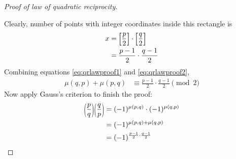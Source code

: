 \documentclass{subfile}
\begin{document}
\begin{proof}[Proof of law of quadratic reciprocity]
\begin{center}
	\end{center}
	Clearly, number of points with integer coordinates inside this rectangle is
	\begin{align}\label{eq:qrlawproof2}
		x
			& =\floor{\frac{p}{2}}\cdot \floor{\frac{q}{2}}\\
			& = \frac{p-1}{2}\cdot\frac{q-1}{2}
	\end{align}
	Combining equations \eqref{eq:qrlawproof1} and \eqref{eq:qrlawproof2},
	\begin{align*}
		\mu(q,p)+\mu(p,q)
			& \equiv \frac{p-1}{2}\cdot\frac{q-1}{2} \pmod 2
	\end{align*}
	Now apply Gauss's criterion to finish the proof:
	\begin{align*}
		\func{}{\dfrac{p}{q}}\func{}{\dfrac{q}{p}}
			&=(-1)^{\mu(p,q)} \cdot (-1)^{\mu(q,p)} \\
			&= (-1)^{\mu(p,q)+\mu(q,p)}\\
			&=(-1)^{\frac{p-1}{2}\cdot\frac{q-1}{2}}
	\end{align*}
\end{proof}
\end{document}
